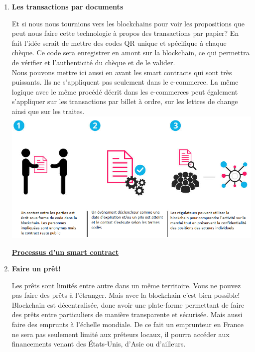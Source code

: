 \documentclass[12pt]{report}
\begin{document}
\begin{enumerate}

     \item \textbf{Les transactions par documents}
     
\hspace{1cm} Et si nous nous tournions vers les blockchains pour voir les propositions que peut nous faire cette technologie à propos des transactions par papier? En fait l'idée serait de mettre des codes QR unique et spécifique à chaque chèque. Ce code sera enregistrer en amont sur la blockchain, ce qui permettra de vérifier et l'authenticité du chèque et de le valider. \\

\hspace{1cm} Nous pouvons mettre ici aussi en avant les smart contracts qui sont très puissants. Ils ne s'appliquent pas seulement dans le e-commerce. La même logique avec le même procédé décrit dans les e-commerces peut également s'appliquer sur les transactions par billet à ordre, sur les lettres de change ainsi que sur les traites.\\

\includegraphics[width=1\textwidth]{contract_smart}
\begin{center}
   \textbf{\underline{Processus d'un smart contract}} \\[1cm]
\end{center}



     \item \textbf{Faire un prêt! }
    
\hspace{1cm} Les prêts sont limités entre autre dans un même territoire. Vous ne pouvez pas faire des prêts à l'étranger. Mais avec la blockchain c'est bien possible! Blockchain  est décentralisée, donc avoir une plate-forme permettant de faire des prêts entre particuliers de manière transparente et sécurisée. Mais aussi faire des emprunts à l'échelle mondiale. De ce fait un emprunteur en France ne sera pas seulement limité aux préteurs locaux, il pourra accéder aux financements venant des États-Unis, d'Asie ou d'ailleurs. \\


\end{enumerate}
\end{document}
